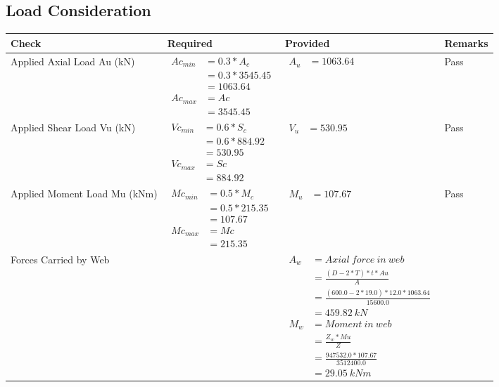 \documentclass{article}%
\begin{document}
\subsection{Load Consideration}%
\label{subsec:LoadConsideration}%
\renewcommand{\arraystretch}{1.2}%
\begin{longtable}{|p{4cm}|p{3.5cm}|p{6.5cm}|p{1.5cm}|}%
\hline%
\rowcolor{OsdagGreen}%
Check&Required&Provided&Remarks\\%
\hline%
\endhead%
\hline%
Applied Axial Load Au (kN)&$\begin{aligned} Ac_{min} &= 0.3 * A_c\\ &= 0.3 *3545.45\\ &=1063.64\\ Ac_{max} &= Ac \\ &=3545.45\end{aligned}$&$\begin{aligned} A_u &=1063.64\end{aligned}$&Pass\\%
\hline%
Applied Shear Load Vu (kN)&$\begin{aligned} Vc_{min} &= 0.6 * S_c\\ &= 0.6 *884.92\\ &=530.95\\ Vc_{max} &= Sc \\ &=884.92\end{aligned}$&$\begin{aligned} V_u &=530.95\end{aligned}$&Pass\\%
\hline%
Applied Moment Load Mu (kNm)&$\begin{aligned} Mc_{min} &= 0.5 * M_c\\ &= 0.5 *215.35\\ &=107.67\\  Mc_{max} &= Mc \\ &=215.35\end{aligned}$&$\begin{aligned} M_u &=107.67\end{aligned}$&Pass\\%
\hline%
Forces Carried by Web&&$\begin{aligned}A_w &= Axial~ force~ in~ web  \\   &= \frac{(D- 2*T)*t* Au }{A} \\ &= \frac{(600.0- 2*19.0)*12.0*1063.64 }{15600.0} \\ &=459.82~ kN\\ M_w &= Moment ~in ~web  \\  &= \frac{Z_w * Mu}{Z} \\ &= \frac{947532.0 * 107.67}{3512400.0} \\ &=29.05~{kNm}\end{aligned}$&\\%

\end{longtable}
\end{document}
